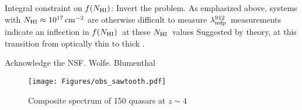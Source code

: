 \documentclass[graybox]{svmult}
\newcommand{\mnhi}{N_{\rm HI}}
\newcommand{\nhi}{$\mnhi$}
\def\cm#1{\, {\rm cm^{#1}}}
\def\mfnhi{f(\mnhi)}
\def\fnhi{$\mfnhi$}
\def\mlmfp{\lambda_{\rm mfp}^{912}}
\def\lmfp{$\mlmfp$}
\begin{document}
Integral constraint on \fnhi: Invert the problem.
As emphasized above, systems with $\mnhi \approx 10^{17} \cm{-2}$
are otherwise difficult to measure
\lmfp\ measurements indicate an inflection in \fnhi\ at these
\nhi\ values
Suggested by theory, at this transition from optically thin to thick
\cite{zm02,altay11}.

%
\begin{acknowledgement}
Acknowledge the NSF.  Wolfe.  Blumenthal
\end{acknowledgement}
%
%
%


%
\begin{figure}[b]
\sidecaption
\texttt{[image: Figures/obs\_sawtooth.pdf]}
%
%
\caption{Composite spectrum of 150 quasars at $z \sim 4$
}
\label{fig:stack_saw}       %
\end{figure}


%
% 
% 
\end{document}
